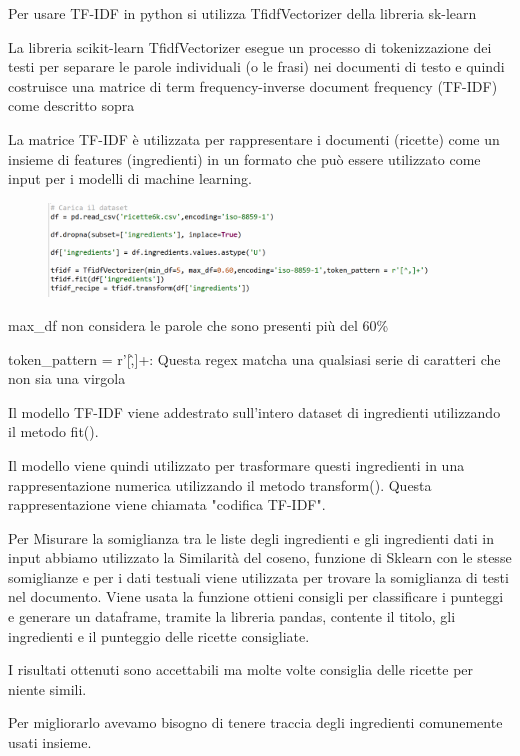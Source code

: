\documentclass[12pt]{report}
\begin{document}
Per usare TF-IDF in python si utilizza TfidfVectorizer della libreria sk-learn 

La libreria scikit-learn TfidfVectorizer esegue un processo di tokenizzazione dei testi per separare le parole individuali (o le frasi) nei documenti di testo e quindi costruisce una matrice di term frequency-inverse document frequency (TF-IDF) come descritto sopra

La matrice TF-IDF è utilizzata per rappresentare i documenti (ricette) come un insieme di features (ingredienti) in un formato che può essere utilizzato come input per i modelli di machine learning.

\begin{figure}[H]
        \centering
        {\includegraphics[width=0.9\textwidth]{img/img12.jpg}}
\end{figure}

max\_df non considera le parole che sono presenti più del 60\% 

token\_pattern = r'[\^,]+: Questa regex matcha una qualsiasi serie di caratteri che non sia una virgola

Il modello TF-IDF viene addestrato sull'intero dataset di ingredienti utilizzando il metodo fit().

Il modello viene quindi utilizzato per trasformare questi ingredienti in una rappresentazione numerica utilizzando il metodo transform(). Questa rappresentazione viene chiamata "codifica TF-IDF".

Per Misurare la somiglianza tra le liste degli ingredienti e gli ingredienti dati in input abbiamo utilizzato la Similarità del coseno, funzione di Sklearn con le stesse somiglianze e per i dati testuali viene utilizzata per trovare la somiglianza di testi nel documento. 
Viene usata la funzione ottieni consigli per classificare i punteggi e generare un dataframe, tramite la libreria pandas, contente il titolo, gli ingredienti e il punteggio delle ricette consigliate.

I risultati ottenuti sono accettabili ma molte volte consiglia delle ricette per niente simili.

Per migliorarlo avevamo bisogno di tenere traccia degli ingredienti comunemente usati insieme. 
\end{document}
